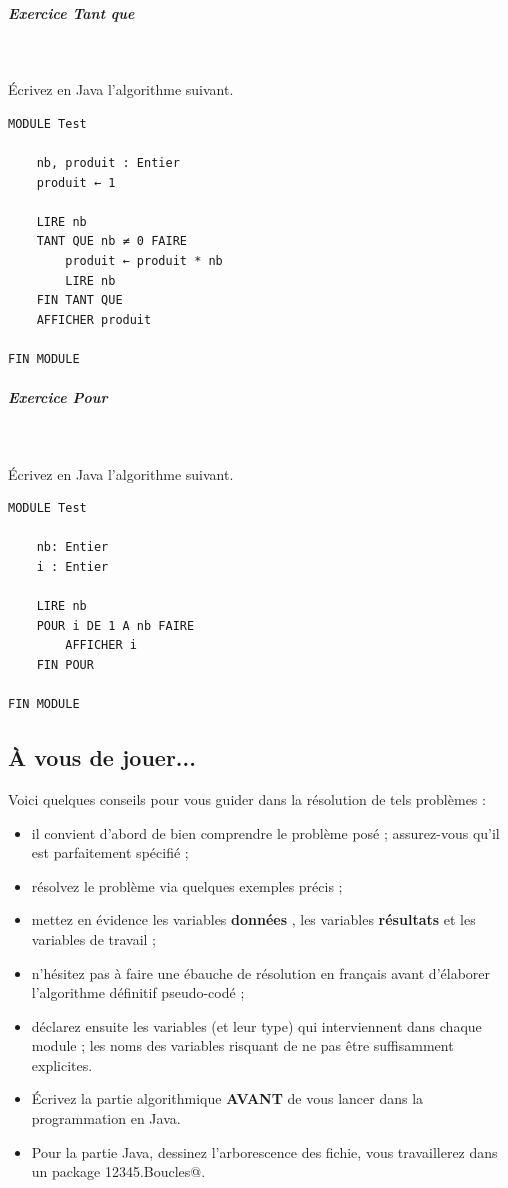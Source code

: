 \documentclass[11pt,a4paper]{article}
\begin{document}
		\subparagraph{Exercice Tant que} 
		
					\textcolor{white}{.} \par
				
					\'Ecrivez en Java l'algorithme suivant.
				
            \par
        \begin{verbatim}
MODULE Test

    nb, produit : Entier
    produit ← 1 

    LIRE nb
    TANT QUE nb ≠ 0 FAIRE
        produit ← produit * nb
        LIRE nb 
    FIN TANT QUE
    AFFICHER produit
    
FIN MODULE
			    \end{verbatim}
			
		\subparagraph{Exercice Pour} 
		
					\textcolor{white}{.} \par
				
					\'Ecrivez en Java l'algorithme suivant.
				
            \par
        \begin{verbatim}
MODULE Test

    nb: Entier
    i : Entier

    LIRE nb
    POUR i DE 1 A nb FAIRE
        AFFICHER i
    FIN POUR

FIN MODULE
			     \end{verbatim}\subsection{\`A vous de jouer...}
          Voici quelques conseils pour vous guider dans la r\'esolution de tels probl\`emes :
          
					\begin{itemize}
				
			\item il convient d'abord de bien comprendre le probl\`eme pos\'e ; assurez-vous qu'il est parfaitement sp\'ecifi\'e ;
			\item r\'esolvez le probl\`eme via quelques exemples pr\'ecis ;
			\item mettez en \'evidence les variables \textbf{\guillemotleft  donn\'ees \guillemotright }, les variables \textbf{\guillemotleft  r\'esultats \guillemotright } et les variables de travail ;
			\item n'h\'esitez pas \`a faire une \'ebauche de r\'esolution en fran\c cais avant d'\'elaborer l'algorithme d\'efinitif pseudo-cod\'e ;
			\item d\'eclarez ensuite les variables (et leur type) qui interviennent dans chaque module ; les noms des variables risquant de ne pas \^etre suffisamment explicites.
			\item \'Ecrivez la partie algorithmique \textbf{AVANT} de vous lancer dans la programmation en Java.
			\item Pour la partie Java, dessinez l'arborescence des fichie, vous travaillerez dans un package  \verb@g12345.Boucles@. 
					\end{itemize}
				
\end{document}
